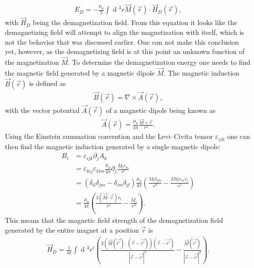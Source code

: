 \documentclass[12pt, a4paper]{article}		%
\renewcommand{\d}[1]{\ensuremath{\operatorname{d}\!{#1}}}
\numberwithin{equation}{section}
\begin{document}
\begin{align}
\label{eq:demagenergy}
E_D = -\frac{\mu_0}{2}\int \d {^3}r \vec{M}(\vec{r})\cdot\vec{H}_D(\vec{r}),
\end{align}
with $\vec{H}_D$ being the demagnetization field. From this equation it looks like the demagnetizing field will attempt to align the magnetization with itself, which is not the behavior that was discussed earlier. One can not make this conclusion yet, however, as the demagnetizing field is at this point an unknown function of the magnetization $\vec{M}$. To determine the demagnetization energy one needs to find the magnetic field generated by a magnetic dipole $\vec{M}$. The magnetic induction $\vec{B}(\vec{r})$ is defined as
\begin{align}
\vec{B}(\vec{r}) = \nabla \times \vec{A}(\vec{r}),
\end{align}
with the vector potential $\vec{A}(\vec{r})$ of a magnetic dipole being known as
\begin{align}
\vec{A}(\vec{r}) = \frac{\mu_0}{4\pi}\frac{\vec{M}\times\vec{r}}{r^3}.
\end{align} 
Using the Einstein summation convention and the Levi--Civita tensor $\varepsilon_{ijk}$ one can then find the magnetic induction generated by a single magnetic dipole:
\begin{align*}
B_i &= \varepsilon_{ijk} \partial_j A_k \\
&= \varepsilon_{kij}\varepsilon_{klm} \frac{\mu_0}{4\pi}\partial_j\frac{M_l r_m}{r^3} \\
&= (\delta_{il}\delta_{jm}-\delta_{im}\delta_{jl})\frac{\mu_0}{4\pi}(\frac{M_l\delta_{jm}}{r^3}-\frac{3M_lr_mr_j}{r^5}) \\
&= \frac{\mu_0}{4\pi}(\frac{3(\vec{M}\cdot\vec{r})r_i}{r^5}-\frac{M_i}{r^3}).
\end{align*}
This means that the magnetic field strength of the demagnetization field generated by the entire magnet at a position $\vec{r}$ is
\begin{align}
\label{eq:demagfield}
\vec{H}_D = \frac{1}{4\pi} \int \d {^3}r' (\frac{3(\vec{M}(\vec{r'}) \cdot (\vec{r}-\vec{r'})) (\vec{r}-\vec{r'})}{|\vec{r}-\vec{r'}|^5}-\frac{\vec{M} (\vec{r'})}{|\vec{r}-\vec{r'}|^3}).
\end{align}
\end{document}
